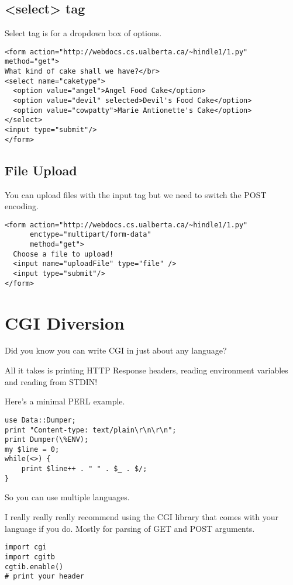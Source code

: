 \documentclass[../CMPUT-404-Notes.tex]{subfiles}
\begin{document}
\subsection{<select> tag}
Select tag is for a dropdown box of options.

\begin{verbatim}
<form action="http://webdocs.cs.ualberta.ca/~hindle1/1.py" method="get">
What kind of cake shall we have?</br>
<select name="caketype">
  <option value="angel">Angel Food Cake</option>
  <option value="devil" selected>Devil's Food Cake</option>
  <option value="cowpatty">Marie Antionette's Cake</option>
</select>
<input type="submit"/>
</form>
\end{verbatim}

\subsection{File Upload}
You can upload files with the input tag but we need to switch the POST encoding.

\begin{verbatim}
<form action="http://webdocs.cs.ualberta.ca/~hindle1/1.py"
      enctype="multipart/form-data"
      method="get">
  Choose a file to upload!
  <input name="uploadFile" type="file" />
  <input type="submit"/>
</form>
\end{verbatim}

\section{CGI Diversion}
Did you know you can write CGI in just about any language?

All it takes is printing HTTP Response headers, reading environment variables and reading from STDIN!

Here's a minimal PERL example.

\begin{verbatim}
use Data::Dumper;
print "Content-type: text/plain\r\n\r\n";
print Dumper(\%ENV);
my $line = 0;
while(<>) {
    print $line++ . " " . $_ . $/;
}
\end{verbatim}

So you can use multiple languages.

I really really really recommend using the CGI library that comes with your language if you do. Mostly for parsing of GET and POST arguments.

\begin{verbatim}
import cgi
import cgitb
cgtib.enable()
# print your header
\end{verbatim}
\end{document}
